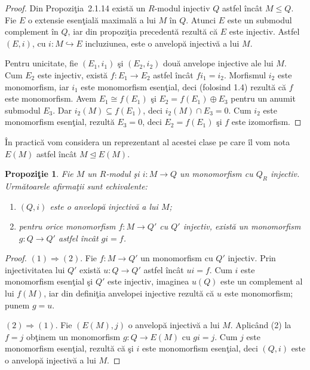 \documentclass[12pt,a4paper]{book}
\newcommand{\ess}{\trianglelefteq}  %
\theoremstyle{plain}
\newtheorem{proposition}[theorem]{Propoziţie}
\theoremstyle{definition}
\theoremstyle{remark}
\begin{document}
\begin{proof}
Din Propoziţia~2.1.14 există un $R$-modul injectiv $Q$ astfel încât
$M \leq Q$.
Fie $E$ o extensie esenţială maximală a lui $M$ în $Q$.
Atunci $E$ este un submodul complement în $Q$, iar din propoziţia
precedentă rezultă că $E$ este injectiv.
Astfel $(E,i)$, cu $i : M \hookrightarrow E$ incluziunea, este o anvelopă
injectivă a lui $M$.

Pentru unicitate, fie $(E_1,i_1)$ şi $(E_2,i_2)$ două anvelope injective
ale lui $M$.
Cum $E_2$ este injectiv, există $f : E_1 \to E_2$ astfel încât
$f i_1 = i_2$.
Morfismul $i_2$ este monomorfism, iar $i_1$ este monomorfism esenţial,
deci (folosind 1.4) rezultă că $f$ este monomorfism.
Avem $E_1 \cong f(E_1)$ şi $E_2 = f(E_1) \oplus E_3$ pentru un anumit
submodul $E_3$.
Dar $i_2(M) \subseteq f(E_1)$, deci $i_2(M) \cap E_3 = 0$.
Cum $i_2$ este monomorfism esenţial, rezultă $E_3 = 0$, deci
$E_2 = f(E_1)$ şi $f$ este izomorfism.
\end{proof}

În practică vom considera un reprezentant al acestei clase pe care îl
vom nota $E(M)$ astfel încât $M \ess E(M)$.

\begin{proposition}
Fie $M$ un $R$-modul şi $i : M \to Q$ un monomorfism cu $Q_R$ injectiv.
Următoarele afirmaţii sunt echivalente:
\begin{enumerate}
  \item $(Q,i)$ este o anvelopă injectivă a lui $M$;
  \item pentru orice monomorfism $f : M \to Q'$ cu $Q'$ injectiv,
        există un monomorfism $g : Q \to Q'$ astfel încât $g i = f$.
\end{enumerate}
\end{proposition}

\begin{proof}
$(1) \Rightarrow (2)$.
Fie $f : M \to Q'$ un monomorfism cu $Q'$ injectiv.
Prin injectivitatea lui $Q'$ există $u : Q \to Q'$ astfel încât
$u i = f$.
Cum $i$ este monomorfism esenţial şi $Q'$ este injectiv, imaginea
$u(Q)$ este un complement al lui $f(M)$, iar din definiţia anvelopei
injective rezultă că $u$ este monomorfism; punem $g=u$.

$(2) \Rightarrow (1)$.
Fie $(E(M),j)$ o anvelopă injectivă a lui $M$.
Aplicând (2) la $f=j$ obţinem un monomorfism
$g : Q \to E(M)$ cu $g i = j$.
Cum $j$ este monomorfism esenţial, rezultă că şi $i$ este monomorfism
esenţial, deci $(Q,i)$ este o anvelopă injectivă a lui $M$.
\end{proof}
\end{document}
